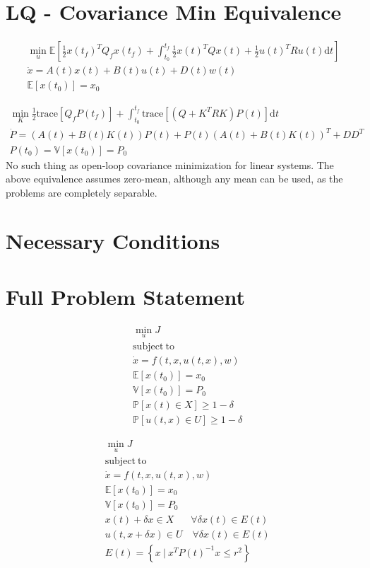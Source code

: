 \documentclass[10pt,a4paper]{article}
\begin{document}
\section{LQ - Covariance Min Equivalence}

\begin{align}
\min_u \mathbb{E}\left[ \frac{1}{2}x(t_f)^TQ_fx(t_f) + \int_{t_0}^{t_f} \frac{1}{2}x(t)^TQx(t) + \frac{1}{2}u(t)^TRu(t)\mathrm{d}t \right] \\
	\dot{x} = A(t)x(t) + B(t)u(t) + D(t)w(t) \\
	\mathbb{E}[x(t_0)] = x_0
\end{align}

\begin{align}
\min_K \frac{1}{2}\mathrm{trace}[Q_fP(t_f)] + \int_{t_0}^{t_f} \mathrm{trace}[(Q + K^TRK)P(t)]\mathrm{d}t \\
	\dot{P} = (A(t)+B(t)K(t))P(t)+ P(t)(A(t) + B(t)K(t))^T + DD^T \\
	P(t_0 ) = \mathbb{V}[x(t_0)] = P_0
\end{align}
No such thing as open-loop covariance minimization for linear systems. The above equivalence assumes zero-mean, although any mean can be used, as the problems are completely separable. 

\section{Necessary Conditions}

\section{Full Problem Statement}
\begin{align*}
&\min_u J \\
&\mathrm{subject\ to}\nonumber\\
&\dot{x} = f(t, x, u(t,x), w) \\
&\mathbb{E}[x(t_0)] = x_0 \\
&\mathbb{V}[x(t_0)] = P_0 \\
&\mathbb{P}[x(t) \in X] \geq 1-\delta\\
&\mathbb{P}[u(t,x) \in U] \geq 1-\delta
\end{align*}

\begin{align*}
&\min_u J \\
&\mathrm{subject\ to}\nonumber\\
&\dot{x} = f(t, x, u(t,x), w) \\
&\mathbb{E}[x(t_0)] = x_0 \\
&\mathbb{V}[x(t_0)] = P_0 \\
&x(t)+\delta x \in X \quad \; \ \ \forall \delta x(t)\in E(t)\\
&u(t,x+\delta x) \in U \quad \forall \delta x(t)\in E(t)\\	
&E(t) = \left\lbrace x\ |\ x^TP(t)^{-1}x \leq r^2 \right\rbrace
\end{align*}
\end{document}
